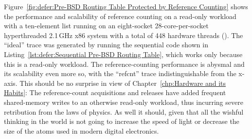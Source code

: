 Figure~\ref{fig:defer:Pre-BSD Routing Table Protected by Reference Counting}
shows the performance and scalability of reference counting on a
read-only workload with a ten-element list running on an eight-socket
28-core-per-socket hyperthreaded 2.1\,GHz x86 system with a total of
448 hardware threads ().
The ``ideal'' trace was generated by running the sequential code shown in
Listing~\ref{lst:defer:Sequential Pre-BSD Routing Table},
which works only because this is a read-only workload.
The reference-counting performance is abysmal and its scalability even
more so, with the ``refcnt'' trace indistinguishable from the x-axis.
This should be no surprise in view of
Chapter~\ref{chp:Hardware and its Habits}:
The reference-count acquisitions and releases have added frequent
shared-memory writes to an otherwise read-only workload, thus
incurring severe retribution from the laws of physics.
As well it should, given that all the wishful thinking in the world
is not going to increase the speed of light or decrease the size of
the atoms used in modern digital electronics.

\fi


